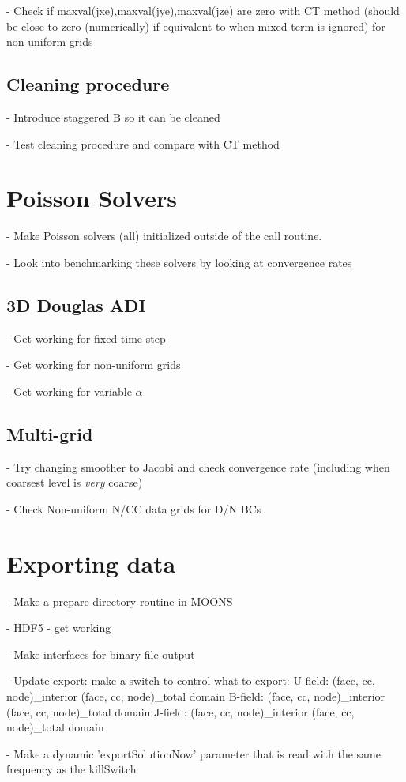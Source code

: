 \documentclass[11pt]{article}
\begin{document}
- Check if maxval(jxe),maxval(jye),maxval(jze) are zero with CT method (should be
  close to zero (numerically) if equivalent to when mixed term is ignored) for non-uniform grids


\subsection{Cleaning procedure}
- Introduce staggered B so it can be cleaned

- Test cleaning procedure and compare with CT method

\section{Poisson Solvers}
- Make Poisson solvers (all) initialized outside of the call routine.

- Look into benchmarking these solvers by looking at convergence rates

\subsection{3D Douglas ADI}
- Get working for fixed time step

- Get working for non-uniform grids

- Get working for variable $\alpha$

\subsection{Multi-grid}
- Try changing smoother to Jacobi and check convergence rate (including when coarsest level is \textit{very} coarse)

- Check Non-uniform N/CC data grids for D/N BCs

\section{Exporting data}
- Make a prepare directory routine in MOONS

- HDF5 - get working

- Make interfaces for binary file output

- Update export: make a switch to control what to export:
      U-field: (face, cc, node)\_interior (face, cc, node)\_total domain
      B-field: (face, cc, node)\_interior (face, cc, node)\_total domain
      J-field: (face, cc, node)\_interior (face, cc, node)\_total domain

- Make a dynamic 'exportSolutionNow' parameter that is read
with the same frequency as the killSwitch
\end{document}
